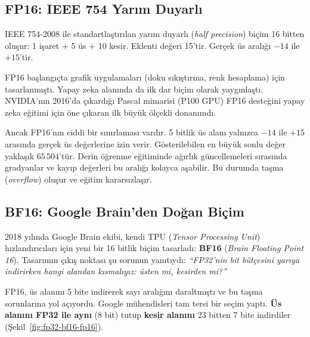 \subsection{FP16: IEEE 754 Yarım Duyarlı}

IEEE 754-2008 ile standartlaştırılan yarım duyarlı (\emph{half precision}) biçim 16 bitten oluşur: 1 işaret $+$ 5 üs $+$ 10 kesir. Eklenti değeri 15'tir. Gerçek üs aralığı $-14$ ile $+15$'tir.

FP16 başlangıçta grafik uygulamaları (doku sıkıştırma, renk hesaplama) için tasarlanmıştı. Yapay zeka alanında da ilk dar biçim olarak yaygınlaştı. NVIDIA'nın 2016'da çıkardığı Pascal mimarisi (P100 GPU) FP16 desteğini yapay zeka eğitimi için öne çıkaran ilk büyük ölçekli donanımdı.

Ancak FP16'nın ciddi bir sınırlaması vardır. 5 bitlik üs alanı yalnızca $-14$ ile $+15$ arasında gerçek üs değerlerine izin verir. Gösterilebilen en büyük sonlu değer yaklaşık $65\,504$'tür. Derin öğrenme eğitiminde ağırlık güncellemeleri sırasında gradyanlar ve kayıp değerleri bu aralığı kolayca aşabilir. Bu durumda taşma (\emph{overflow}) oluşur ve eğitim kararsızlaşır.

\subsection{BF16: Google Brain'den Doğan Biçim}

2018 yılında Google Brain ekibi, kendi TPU (\emph{Tensor Processing Unit}) hızlandırıcıları için yeni bir 16 bitlik biçim tasarladı: \textbf{BF16} (\emph{Brain Floating Point 16}). Tasarımın çıkış noktası şu sorunun yanıtıydı: \emph{``FP32'nin bit bütçesini yarıya indirirken hangi alandan kısmalıyız: üsten mi, kesirden mi?''}

FP16, üs alanını 5 bite indirerek sayı aralığını daraltmıştı ve bu taşma sorunlarına yol açıyordu. Google mühendisleri tam tersi bir seçim yaptı. \textbf{Üs alanını FP32 ile aynı} (8 bit) tutup \textbf{kesir alanını} 23 bitten 7 bite indirdiler (Şekil~\ref{fig:fp32-bf16-fp16}).


